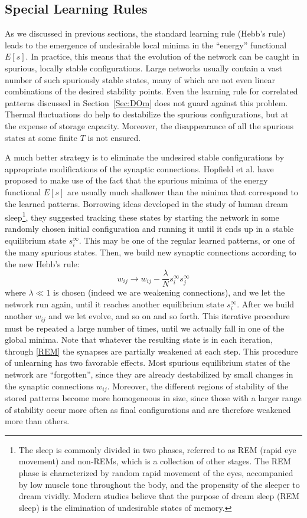 \subsection{Special Learning Rules}\label{sec:Speciallearningrules}
As we discussed in previous sections, the standard learning rule (Hebb's rule) leads to the emergence of undesirable local minima in the ``energy'' functional $E[s]$. In practice, this means that the evolution of the network can be caught in spurious, locally stable configurations. Large networks usually contain a vast number of such spuriously stable states, many of which are not even linear combinations of the desired stability points. Even the learning rule for correlated patterns discussed in Section~\ref{Sec:DOm} does not guard against this problem. Thermal fluctuations do help to destabilize the spurious configurations, but at the expense of storage capacity. Moreover, the disappearance of all the spurious states at some finite $T$ is not ensured.

A much better strategy is to eliminate the undesired stable configurations by appropriate modifications of the synaptic connections. Hopfield et al. have proposed to make use of the fact that the spurious minima of the energy functional $E[s]$ are usually much shallower than the minima that correspond to the learned patterns. Borrowing ideas developed in the study of human dream sleep\footnote{The sleep is commonly divided in two phases, referred to as REM (rapid eye movement) and non-REMs, which is a collection of other stages. The REM phase is characterized by random rapid movement of the eyes, accompanied by low muscle tone throughout the body, and the propensity of the sleeper to dream vividly. Modern studies believe that the purpose of dream sleep (REM sleep) is the elimination of undesirable states of memory.}, they suggested tracking these states by starting the network in some randomly chosen initial configuration and running it until it ends up in a stable equilibrium state $s_i^\infty$. This may be one of the regular learned patterns, or one of the many spurious states. Then, we build new synaptic connections according to the new Hebb's rule:
\begin{equation}\label{REM}
w_{ij}\rightarrow w_{ij}-\frac{\lambda}{N}s_i^\infty s_j^\infty
\end{equation}
where $\lambda\ll1$ is chosen (indeed we are weakening connections), and we let the network run again, until it reaches another equilibrium state $s_i^\infty$. After we build another $w_{ij}$ and we let evolve, and so on and so forth. This iterative procedure must be repeated a large number of times, until we actually fall in one of the global minima. Note that whatever the resulting state is in each iteration, through \eqref{REM} the synapses are partially weakened at each step. This procedure of unlearning has two favorable effects. Most spurious equilibrium states of the network are ``forgotten'', since they are already destabilized by small changes in the synaptic connections $w_{ij}$. Moreover, the different regions of stability of the stored patterns become more homogeneous in size, since those with a larger range of stability occur more often as final configurations and are therefore weakened more than others.

